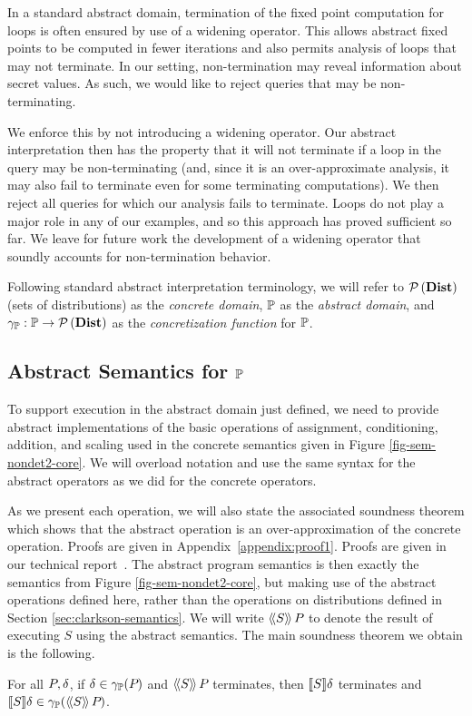 In a standard abstract domain, termination of the
fixed point computation for loops is often ensured by use of a widening
operator.  This allows abstract fixed points to be computed in fewer
iterations and also permits analysis of loops that may not terminate.
In our setting, non-termination may reveal information about secret
values.  As such, we would like to reject queries that may be non-terminating.

We enforce this by not introducing a widening operator.  Our abstract
interpretation then has the property that it will not terminate if a loop
in the query may be non-terminating
(and, since it is an over-approximate analysis, it may also fail to terminate
even for some terminating computations).  We then reject all queries for
which our analysis fails to terminate.
Loops do not play a major role
in any of our examples, and so this approach has proved sufficient so far.
We leave for future work the development of a widening operator that soundly
accounts for non-termination behavior.

Following standard abstract interpretation terminology, we will refer to $\mathcal{P}\left( \textbf{Dist} \right)$ (sets of distributions) as the \textit{concrete domain}, $\mathbb{P}$ as the \textit{abstract domain}, and $\gamma_{\mathbb{P}} : \mathbb{P} \rightarrow \mathcal{P}\left( \textbf{Dist} \right)$ as the \textit{concretization function} for $\mathbb{P}$.

\subsection{Abstract Semantics for $\mathbb{P}$}

To support execution in the abstract domain just defined, we need
to provide abstract implementations of the basic operations of assignment,
conditioning, addition, and scaling used in the concrete semantics given in
Figure \ref{fig-sem-nondet2-core}.  We will overload notation and use the
same syntax for the abstract operators as we did for the concrete operators.

As we present each operation, we will also state the associated
soundness theorem which shows that the abstract operation is an
over-approximation of the concrete operation.  
\iffull
Proofs are given in Appendix~\ref{appendix:proof1}.
\else
Proofs are given in our technical report~\cite{TR}.
\fi
The abstract program
semantics is then exactly the semantics from Figure
\ref{fig-sem-nondet2-core}, but making use of the abstract operations
defined here, rather than the operations on distributions defined in Section \ref{sec:clarkson-semantics}.
We will write
$\langle\!\langle{S}\rangle\!\rangle\,{P_{}}$ to denote the result of executing $S$ using the
abstract semantics.  The main soundness theorem we obtain is the following.
\begin{theorem}
\label{thm:pp:soundness}
For all $P_{}, \delta$, if $ \delta \in \gamma_{\mathbb{P}}(P_{}) $ and
$ \langle\!\langle{S}\rangle\!\rangle\,{P_{}} $ terminates, then $ [\![{S}]\!]{\delta} $ terminates and $
[\![{S}]\!]{\delta} \in \gamma_{\mathbb{P}}(\langle\!\langle{S}\rangle\!\rangle\,{P_{}}) $.
\end{theorem}

